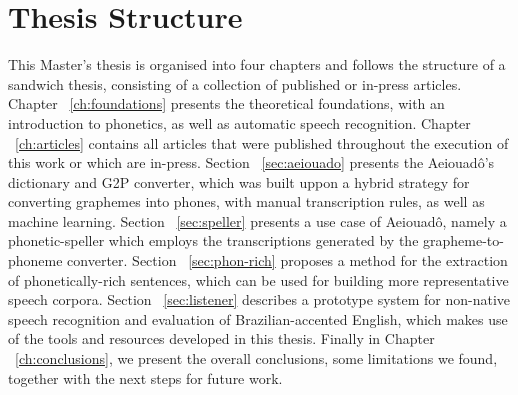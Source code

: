 \section*{Thesis Structure}

This Master's thesis is organised into four chapters and follows the structure of a sandwich thesis, consisting of a collection of published or in-press articles. Chapter ~\ref{ch:foundations} presents the theoretical foundations, with an introduction to phonetics, as well as automatic speech recognition. Chapter ~\ref{ch:articles} contains all articles that were published throughout the execution of this work or which are in-press. Section ~\ref{sec:aeiouado} presents the Aeiouad\^o's dictionary and \ac{G2P} converter, which was built uppon a hybrid strategy for converting graphemes into phones, with manual transcription rules, as well as machine learning. Section ~\ref{sec:speller} presents a use case of Aeiouad\^o, namely a phonetic-speller which employs the transcriptions generated by the grapheme-to-phoneme converter. Section ~\ref{sec:phon-rich} proposes a method for the extraction of phonetically-rich sentences, which can be used for building more representative speech corpora. Section ~\ref{sec:listener} describes a prototype system for non-native speech recognition and evaluation of Brazilian-accented English, which makes use of the tools and resources developed in this thesis. Finally in Chapter ~\ref{ch:conclusions}, we present the overall conclusions, some limitations we found, together with the next steps for future work.